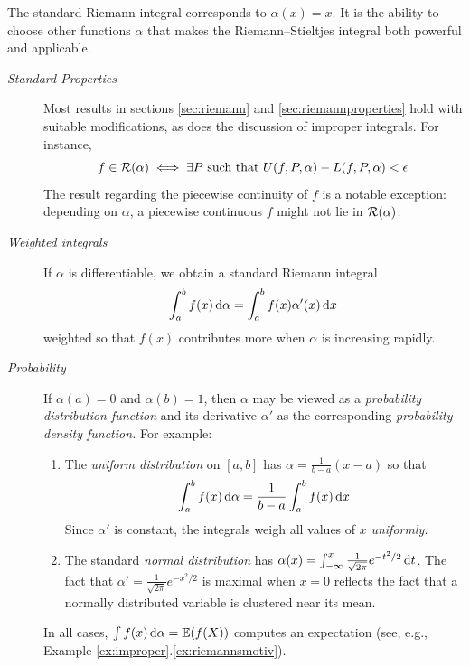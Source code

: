 The standard Riemann integral corresponds to $\alpha(x)=x$. It is the ability to choose other functions $\alpha$ that makes the Riemann--Stieltjes integral both powerful and applicable. 

\begin{description}
	\item[\normalfont\emph{Standard Properties}] Most results in sections \ref{sec:riemann} and \ref{sec:riemannproperties} hold with suitable modifications, as does the discussion of improper integrals. For instance,
  \[
  	f\in\mathcal{R}(\alpha) \iff \exists P\text{ such that }U(f,P,\alpha)-L(f,P,\alpha)<\epsilon
  \]
  The result regarding the piecewise continuity of $f$ is a notable exception: depending on  $\alpha$, a piecewise continuous $f$ might not lie in $\mathcal{R}(\alpha)$.
  	
	\item[\normalfont\emph{Weighted integrals}] If $\alpha$ is differentiable, we obtain a standard Riemann integral
  \[
  	\int_a^bf(x)\,\mathrm{d}\alpha =\int_a^bf(x)\alpha'(x)\,{\mathrm{d} x}
  \]
  weighted so that $f(x)$ contributes more when $\alpha$ is increasing rapidly.
  
  \item[\normalfont\emph{Probability}] If $\alpha(a)=0$ and $\alpha(b)=1$, then $\alpha$ may be viewed as a \emph{probability distribution function}
  and its derivative $\alpha'$ as the corresponding \emph{probability density function.} For example:
  \begin{enumerate}
    \item The \emph{uniform distribution} on $[a,b]$ has $\alpha=\frac 1{b-a}(x-a)$ so that
    \[
    	\int_a^bf(x)\,\mathrm{d}\alpha =\frac 1{b-a}\int_a^bf(x)\,{\mathrm{d} x}
    \] 
    Since $\alpha'$ is constant, the integrals weigh all values of $x$ \emph{uniformly.}
    
    \item The standard \emph{normal distribution} has $\alpha(x)=\int_{-\infty}^x\frac 1{\sqrt{2\pi}}e^{-t^2/2}\,{\mathrm{d} t}$. The fact that $\alpha'=\frac 1{\sqrt{2\pi}}e^{-x^2/2}$ is maximal when $x=0$ reflects the fact that a normally distributed variable is clustered near its mean.
  \end{enumerate}
  In all cases, $\int f(x)\,\mathrm{d}\alpha=\mathbb{E}(f(X))$ computes an expectation (see, e.g., Example \ref*{ex:improper}.\ref*{ex:riemannsmotiv}).
  

\end{description}
